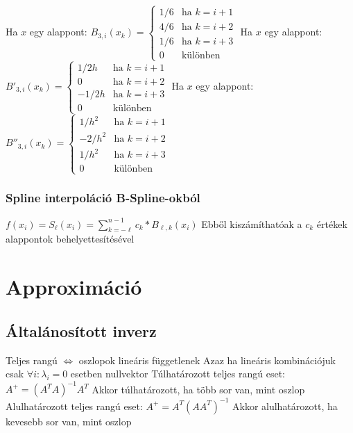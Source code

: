 \documentclass[12pt,a4paper]{article}
\begin{document}
\begin{outline}
		\2 Ha $x$ egy alappont: $B_{3,i}(x_k) = \begin{cases}
			1/6 & \text{ha } k = i + 1 \\
			4/6 & \text{ha } k = i + 2 \\
			1/6 & \text{ha } k = i + 3 \\
			0 & \text{különben}
		\end{cases}$
		\2 Ha $x$ egy alappont: $B'_{3,i}(x_k) = \begin{cases}
			1/2h & \text{ha } k = i + 1 \\
			0 & \text{ha } k = i + 2 \\
			-1/2h & \text{ha } k = i + 3 \\
			0 & \text{különben}
		\end{cases}$
		\2 Ha $x$ egy alappont: $B''_{3,i}(x_k) = \begin{cases}
			1/h^2 & \text{ha } k = i + 1 \\
			-2/h^2 & \text{ha } k = i + 2 \\
			1/h^2 & \text{ha } k = i + 3 \\
			0 & \text{különben}
		\end{cases}$
\end{outline}

\subsubsection{Spline interpoláció B-Spline-okból}

\begin{outline}
	\1 $f(x_i) = S_\ell(x_i) = \sum_{k=-\ell}^{n-1} c_k * B_{\ell,k}(x_i)$
		\2 Ebből kiszámíthatóak a $c_k$ értékek alappontok behelyettesítésével
\end{outline}

\pagebreak

\section{Approximáció}

\subsection{Általánosított inverz}

\begin{outline}
	\1 Teljes rangú $\Leftrightarrow$ oszlopok lineáris függetlenek
		\2 Azaz ha lineáris kombinációjuk csak $\forall i: \lambda_i=0$ esetben nullvektor
	\1 Túlhatározott teljes rangú eset: $A^+ = (A^TA)^{-1}A^T$
		\2 Akkor túlhatározott, ha több sor van, mint oszlop
	\1 Alulhatározott teljes rangú eset: $A^+ = A^T(AA^T)^{-1}$
		\2 Akkor alulhatározott, ha kevesebb sor van, mint oszlop
\end{outline}
\end{document}
